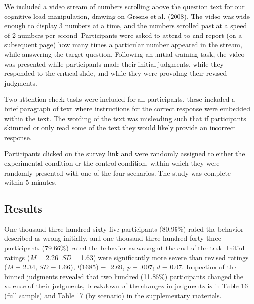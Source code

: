 \documentclass[
  american,
  man,floatsintext]{apa7}
\begin{document}
We included a video stream of numbers scrolling above the question text for our cognitive load manipulation, drawing on Greene et al. (2008). The video was wide enough to display 3 numbers at a time, and the numbers scrolled past at a speed of 2 numbers per second. Participants were asked to attend to and report (on a subsequent page) how many times a particular number appeared in the stream, while answering the target question. Following an initial training task, the video was presented while participants made their initial judgments, while they responded to the critical slide, and while they were providing their revised judgments.

Two attention check tasks were included for all participants, these included a brief paragraph of text where instructions for the correct response were embedded within the text. The wording of the text was misleading such that if participants skimmed or only read some of the text they would likely provide an incorrect response.

Participants clicked on the survey link and were randomly assigned to either the experimental condition or the control condition, within which they were randomly presented with one of the four scenarios. The study was complete within 5 minutes.

\hypertarget{results}{%
\subsection{Results}\label{results}}

One thousand three hundred sixty-five participants (80.96\%) rated the behavior described as wrong initially, and one thousand three hundred forty three participants (79.66\%) rated the behavior as wrong at the end of the task. Initial ratings (\emph{M} = 2.26, \emph{SD} = 1.63) were significantly more severe than revised ratings (\emph{M} = 2.34, \emph{SD} = 1.66), \emph{t}(1685) = -2.69, \emph{p} = .007; \emph{d} = 0.07. Inspection of the binned judgments revealed that two hundred (11.86\%) participants changed the valence of their judgments, breakdown of the changes in judgments is in Table 16 (full sample) and Table 17 (by scenario) in the supplementary materials.
\end{document}
